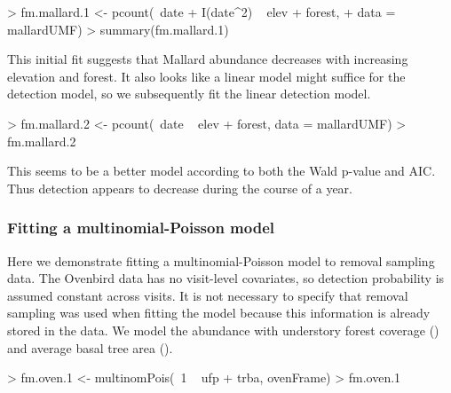 \documentclass[article,shortnames]{jss}
\begin{document}
\begin{Schunk}
\begin{Sinput}
> fm.mallard.1 <- pcount(~date + I(date^2) ~ elev + forest, 
+     data = mallardUMF)
> summary(fm.mallard.1)
\end{Sinput}
\end{Schunk}

This initial fit suggests that Mallard abundance decreases with
increasing elevation and forest.  It also looks like a linear model
might suffice for the detection model, so we subsequently fit the
linear detection model.


\begin{Schunk}
\begin{Sinput}
> fm.mallard.2 <- pcount(~date ~ elev + forest, data = mallardUMF)
> fm.mallard.2
\end{Sinput}
\end{Schunk}

This seems to be a better model according to both the Wald p-value and
AIC.  Thus detection appears to decrease during the course of a year.




\subsubsection{Fitting a multinomial-Poisson model}

Here we demonstrate fitting a multinomial-Poisson model to removal sampling 
data.  The Ovenbird data has no visit-level covariates, so detection
probability is assumed constant across visits.  It is not necessary
to specify that removal sampling was used when fitting the model
because this information is already stored in the  data.
We model the abundance with understory forest coverage ()
and average basal tree area ().

\begin{Schunk}
\begin{Sinput}
> fm.oven.1 <- multinomPois(~1 ~ ufp + trba, ovenFrame)
> fm.oven.1
\end{Sinput}
\end{Schunk}
\end{document}
